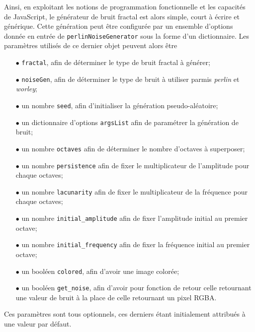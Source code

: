 \documentclass[11pt]{article}
\begin{document}
Ainsi, en exploitant les notions de programmation fonctionnelle et les capacités de JavaScript, le générateur de bruit fractal est alors simple, court à écrire et générique. Cette génération peut être configurée par un ensemble d'options donnée en entrée de \texttt{perlinNoiseGenerator} sous la forme d'un dictionnaire. Les paramètres utilisés de ce dernier objet peuvent alors être
\begin{itemize}
    \item [$\bullet$] \texttt{fractal}, afin de déterminer le type de bruit fractal à générer;
    \item [$\bullet$] \texttt{noiseGen}, afin de déterminer le type de bruit à utiliser parmis \textit{perlin} et \textit{worley};
    \item [$\bullet$] un nombre \texttt{seed}, afin d'initialiser la génération pseudo-aléatoire;
    \item [$\bullet$] un dictionnaire d'options \texttt{argsList} afin de paramétrer la génération de bruit;
    \item [$\bullet$] un nombre \texttt{octaves} afin de déterminer le nombre d'octaves à superposer;
    \item [$\bullet$] un nombre \texttt{persistence} afin de fixer le multiplicateur de l'amplitude pour chaque octaves;
    \item [$\bullet$] un nombre \texttt{lacunarity} afin de fixer le multiplicateur de la fréquence pour chaque octaves;
    \item [$\bullet$] un nombre \texttt{initial\_amplitude} afin de fixer l'amplitude initial au premier octave;
    \item [$\bullet$] un nombre \texttt{initial\_frequency} afin de fixer la fréquence initial au premier octave;
    \item [$\bullet$] un booléen \texttt{colored}, afin d'avoir une image colorée;
    \item [$\bullet$] un booléen \texttt{get\_noise}, afin d'avoir pour fonction de retour celle retournant une valeur de bruit à la place de celle retournant un pixel RGBA.
\end{itemize}
Ces paramètres sont tous optionnels, ces derniers étant initialement attribués à une valeur par défaut.
\end{document}
